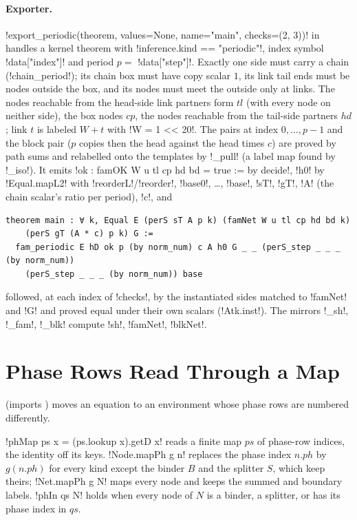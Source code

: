{\paragraph{Exporter.} \py!export_periodic(theorem, values=None, name="main", checks=(2, 3))! in  handles a kernel theorem with \py!inference.kind == "periodic"!, index symbol \py!data["index"]! and period $p=$ \py!data["step"]!. Exactly one side must carry a chain (\py!chain_period!); its chain box must have copy scalar $1$, its link tail ends must be nodes outside the box, and its nodes must meet the outside only at links. The nodes reachable from the head-side link partners form $\mathit{tl}$ (with every node on neither side), the box nodes $\mathit{cp}$, the nodes reachable from the tail-side partners $\mathit{hd}$; link $t$ is labeled $W+t$ with \py!W = 1 << 20!. The pairs at index $0,\dots,p-1$ and the block pair ($p$ copies then the head against the head times $c$) are proved by path sums and relabelled onto the templates by \py!_pull! (a label map found by \py!_iso!). It emits \lbx!ok : famOK W u tl cp hd bd = true := by decide!, \lbx!h0! by \lbx!Equal.mapL2! with \lbx!reorderL!/\lbx!reorder!, \lbx!base0!, \ldots, \lbx!base!, \lbx!sT!, \lbx!gT!, \lbx!A! (the chain scalar's ratio per period), \lbx!c!, and
\begin{lstlisting}[style=leanbox]
theorem main : ∀ k, Equal E (perS sT A p k) (famNet W u tl cp hd bd k)
    (perS gT (A * c) p k) G :=
  fam_periodic E hD ok p (by norm_num) c A h0 G _ _ (perS_step _ _ _ (by norm_num))
    (perS_step _ _ _ (by norm_num)) base
\end{lstlisting}
followed, at each index of \py!checks!, by the instantiated sides matched to \lbx!famNet! and \lbx!G! and proved equal under their own scalars (\lbx!At{k}.inst!). The mirrors \py!_sh!, \py!_fam!, \py!_blk! compute \lbx!sh!, \lbx!famNet!, \lbx!blkNet!.

\section{Phase Rows Read Through a Map}\label{sec:boxes-phasemap}

 (imports ) moves an equation to an environment whose phase rows are numbered differently.

\begin{definition}\label{def:boxes-phmap}
\lbx!phMap ps x = (ps.lookup x).getD x! reads a finite map $\mathit{ps}$ of phase-row indices, the identity off its keys. \lbx!Node.mapPh g n! replaces the phase index $n.\mathit{ph}$ by $g(n.\mathit{ph})$ for every kind except the binder $B$ and the splitter $S$, which keep theirs; \lbx!Net.mapPh g N! maps every node and keeps the summed and boundary labels. \lbx!phIn qs N! holds when every node of $N$ is a binder, a splitter, or has its phase index in $\mathit{qs}$.
\end{definition}

}
